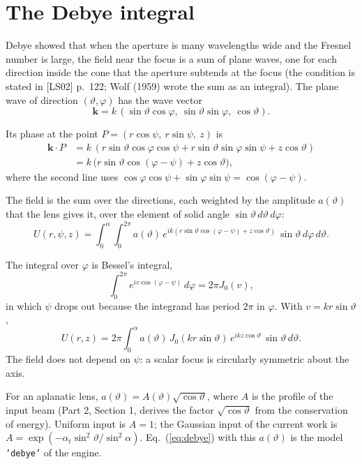 \documentclass[11pt]{article}
\begin{document}
\section{The Debye integral}
 Debye showed that when the aperture is many wavelengths wide and the Fresnel number is large, the field near
the focus is a sum of plane waves, one for each direction inside the cone that the aperture subtends at the focus
(the condition is stated in [LS02] p.~122; Wolf (1959) wrote the sum as an integral). The plane wave of direction $(\vartheta, \varphi)$ has the wave vector
\begin{equation}\mathbf k = k\,(\sin\vartheta\cos\varphi,\ \sin\vartheta\sin\varphi,\ \cos\vartheta) .\end{equation}

 Its phase at the point $P = (r\cos\psi,\ r\sin\psi,\ z)$ is
\begin{align}\mathbf k\cdot P &= k\,(r\sin\vartheta\cos\varphi\cos\psi + r\sin\vartheta\sin\varphi\sin\psi
+ z\cos\vartheta)\\
&= k\,\big(r\sin\vartheta\cos(\varphi - \psi) + z\cos\vartheta\big),\end{align}
where the second line uses $\cos\varphi\cos\psi + \sin\varphi\sin\psi = \cos(\varphi - \psi)$.

 The field is the sum over the directions, each weighted by the amplitude $a(\vartheta)$ that the lens gives
it, over the element of solid angle $\sin\vartheta\,d\vartheta\,d\varphi$:
\begin{equation}U(r,\psi,z) = \int_0^\alpha\!\!\int_0^{2\pi} a(\vartheta)\,
e^{ik(r\sin\vartheta\cos(\varphi-\psi) + z\cos\vartheta)}\,\sin\vartheta\,d\varphi\,d\vartheta .
\label{eq:debye2}\end{equation}

 The integral over $\varphi$ is Bessel's integral,
\begin{equation}\int_0^{2\pi} e^{iv\cos(\varphi-\psi)}\,d\varphi = 2\pi J_0(v) ,\end{equation}
in which $\psi$ drops out because the integrand has period $2\pi$ in $\varphi$. With $v = kr\sin\vartheta$,
\begin{equation}U(r,z) = 2\pi\int_0^\alpha a(\vartheta)\,J_0(kr\sin\vartheta)\,e^{ikz\cos\vartheta}\,
\sin\vartheta\,d\vartheta .\label{eq:debye}\end{equation}
The field does not depend on $\psi$: a scalar focus is circularly symmetric about the axis.

 For an aplanatic lens, $a(\vartheta) = A(\vartheta)\sqrt{\cos\vartheta}$, where $A$ is the profile of the
input beam (Part 2, Section 1, derives the factor $\sqrt{\cos\vartheta}$ from the conservation of energy).
Uniform input is $A = 1$; the Gaussian input of the current work is
$A = \exp(-\alpha_t\sin^2\vartheta/\sin^2\alpha)$. Eq.~(\ref{eq:debye}) with this $a(\vartheta)$ is the model
\texttt{'debye'} of the engine.
\end{document}
